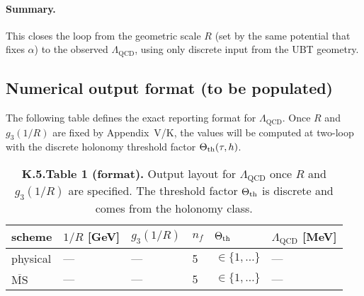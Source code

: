 \paragraph{Summary.}
This closes the loop from the geometric scale $R$ (set by the same potential that fixes $\alpha$) to the observed $\Lambda_{\mathrm{QCD}}$,
using only discrete input from the UBT geometry.

\subsection*{Numerical output format (to be populated)}
The following table defines the exact reporting format for $\Lambda_{\mathrm{QCD}}$. Once $R$ and $g_3(1/R)$ are fixed by Appendix~V/K, the values will be computed at two-loop with the discrete holonomy threshold factor $\Theta_{\rm th}(\tau,h)$.
\begin{table}[h]
\centering
\small
\caption{\textbf{K.5.Table 1 (format).} Output layout for $\Lambda_{\mathrm{QCD}}$ once $R$ and $g_3(1/R)$ are specified. The threshold factor $\Theta_{\rm th}$ is discrete and comes from the holonomy class.}
\begin{tabular}{llllll}
\hline
scheme & $1/R$ [GeV] & $g_3(1/R)$ & $n_f$ & $\Theta_{\rm th}$ & $\Lambda_{\mathrm{QCD}}$ [MeV] \\
\hline
physical & --- & --- & 5 & $\in\{1,\dots\}$ & --- \\
$\overline{\mathrm{MS}}$ & --- & --- & 5 & $\in\{1,\dots\}$ & --- \\
\hline
\end{tabular}
\end{table}
